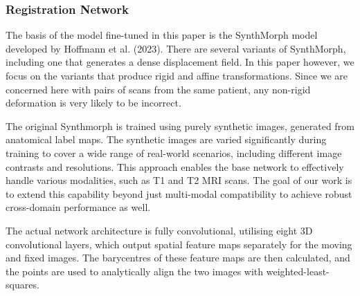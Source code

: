 \subsubsection{Registration Network}
The basis of the model fine-tuned in this paper is the SynthMorph model developed by Hoffmann et al. (2023)\cite{synthmorphModel}. There are several variants of SynthMorph, including one that generates a dense displacement field. In this paper however, we focus on the variants that produce rigid and affine transformations. Since we are concerned here with pairs of scans from the same patient, any non-rigid deformation is very likely to be incorrect.

The original Synthmorph is trained using purely synthetic images, generated from anatomical label maps. The synthetic images are varied significantly during training to cover a wide range of real-world scenarios, including different image contrasts and resolutions. This approach enables the base network to effectively handle various modalities, such as T1 and T2 MRI scans. The goal of our work is to extend this capability beyond just multi-modal compatibility to achieve robust cross-domain performance as well.

The actual network architecture is fully convolutional, utilising eight 3D convolutional layers, which output spatial feature maps separately for the moving and fixed images. The barycentres of these feature maps are then calculated, and the points are used to analytically align the two images with weighted-least-squares.




